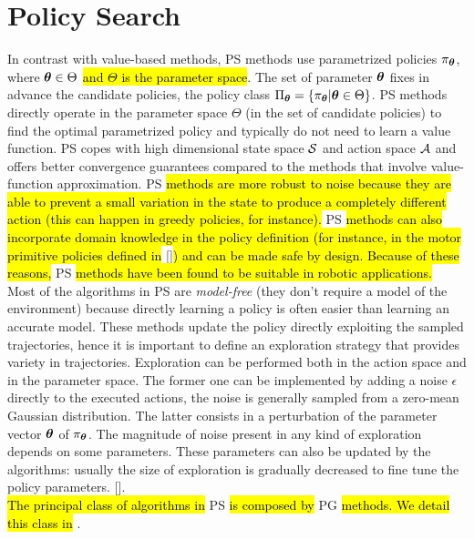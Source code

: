 \section{Policy Search}\label{sec:ps}
In contrast with value-based methods, \acf{PS} methods use parametrized policies $\pi_{\boldsymbol{\theta}}$, where $\boldsymbol{\theta} \in \Theta$ \hl{and $\Theta$ is the parameter space}. The set of parameter $\boldsymbol{\theta}$ fixes in advance the candidate policies, \ie the policy class $\Pi_{\boldsymbol{\theta}} = \{ \pi_{\boldsymbol{\theta}} | \boldsymbol{\theta} \in \Theta \}$. \ac{PS} methods directly operate in the parameter space $\Theta$ (\ie in the set of candidate policies) to find the optimal parametrized policy and typically do not need to learn a value function. \ac{PS} copes with high dimensional state space $\mathcal{S}$ and action space $\mathcal{A}$ and offers better convergence guarantees compared to the methods that involve value-function approximation. \ac{PS} \hl{methods are more robust to noise because they are able to prevent a small variation in the state to produce a completely different action (this can happen in greedy policies, for instance).} \ac{PS} \hl{methods can also incorporate domain knowledge in the policy definition (for instance, in the motor primitive policies defined in} [\cite{Peters2008ReinforcementLO}]\hl{) and can be made safe by design. Because of these reasons,} \ac{PS} \hl{methods have been found to be suitable in robotic applications.}\\
\newline
Most of the algorithms in \ac{PS} are \emph{model-free} (\ie they don't require a model of the environment) because directly learning a policy is often easier than learning an accurate model. These methods update the policy directly exploiting the sampled trajectories, hence it is important to define an exploration strategy that provides variety in trajectories. Exploration can be performed both in the action space and in the parameter space. The former one can be implemented by adding a noise $\epsilon$ directly to the executed actions, the noise is generally sampled from a zero-mean Gaussian distribution. The latter consists in a perturbation of the parameter vector $\boldsymbol{\theta}$ of $\pi_{\boldsymbol{\theta}}$. The magnitude of noise present in any kind of exploration depends on some parameters. These parameters can also be updated by the algorithms: usually the size of exploration is gradually decreased to fine tune the policy parameters. [\cite{deisenroth2013Survey}].\\
\newline
\hl{The principal class of algorithms in} \ac{PS} \hl{is composed by} \acf{PG} \hl{methods. We detail this class in} .

